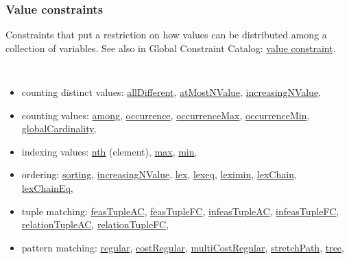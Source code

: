 \subsubsection{Value constraints}\label{model:valueconstraints}\hypertarget{model:valueconstraints}{}
Constraints that put a restriction on how values can be distributed among a collection of variables.
See also in Global Constraint Catalog: \href{http://www.emn.fr/x-info/sdemasse/gccat/Kvalue_constraint.html}{value constraint}.

\vspace{1em}\noindent\begin{notedef}\tt
  \begin{itemize}
  \item counting distinct values: 
\hyperlink{alldifferent:alldifferentconstraint}{allDifferent}, 
\hyperlink{atmostnvalue:atmostnvalueconstraint}{atMostNValue},
\hyperlink{increasingnvalue:increasingnvalueconstraint}{increasingNValue},
  \item counting values: 
\hyperlink{among:amongconstraint}{among},
\hyperlink{occurrence:occurrenceconstraint}{occurrence},
\hyperlink{occurrencemax:occurrencemaxconstraint}{occurrenceMax},
\hyperlink{occurrencemin:occurrenceminconstraint}{occurrenceMin},
\hyperlink{globalcardinality:globalcardinalityconstraint}{globalCardinality},
  \item indexing values: 
\hyperlink{nth:nthconstraint}{nth} (element),
\hyperlink{max:maxconstraint}{max},
\hyperlink{min:minconstraint}{min},
  \item ordering: 
\hyperlink{sorting:sortingconstraint}{sorting},
\hyperlink{increasingnvalue:increasingnvalueconstraint}{increasingNValue},
\hyperlink{lex:lexconstraint}{lex}, 
\hyperlink{lexeq:lexeqconstraint}{lexeq},
\hyperlink{leximin:leximinconstraint}{leximin},
\hyperlink{lexchain:lexchainconstraint}{lexChain},
\hyperlink{lexchaineq:lexchaineqconstraint}{lexChainEq},
  \item tuple matching: 
\hyperlink{feastupleac:feastupleacconstraint}{feasTupleAC},
\hyperlink{feastuplefc:feastuplefcconstraint}{feasTupleFC},
\hyperlink{infeastupleac:infeastupleacconstraint}{infeasTupleAC},
\hyperlink{infeastuplefc:infeastuplefcconstraint}{infeasTupleFC},
\hyperlink{relationtupleac:relationtupleacconstraint}{relationTupleAC},
\hyperlink{relationtuplefc:relationtuplefcconstraint}{relationTupleFC},
  \item pattern matching: 
\hyperlink{regular:regularconstraint}{regular},
\hyperlink{costregular:costregularconstraint}{costRegular},
\hyperlink{multicostregular:multicostregularconstraint}{multiCostRegular}, 
\hyperlink{stretchpath:stretchpathconstraint}{stretchPath}, 
\hyperlink{tree:treeconstraint}{tree},
  \end{itemize}
\end{notedef}

